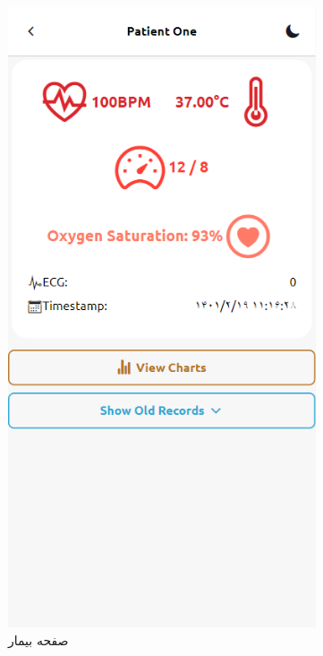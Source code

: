 \documentclass[12pt]{article}
\begin{document}
\begin{figure} %
	\begin{center}
		\begin{subfigure}{.3\textwidth}
			\includegraphics[width=.9\linewidth]{app_patients}
			\caption{صفحه بیمار}
			\label{patients_screen}
		\end{subfigure}
		\begin{subfigure}{.3\textwidth}

\end{subfigure}
\end{center}
\end{figure}
\end{document}
